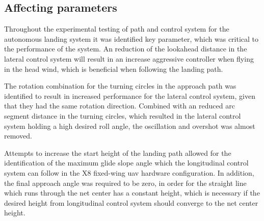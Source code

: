 \subsection{Affecting parameters}
Throughout the experimental testing of path and control system for the autonomous landing system it was identified key parameter, which was critical to the performance of the system. An reduction of the lookahead distance in the lateral control system will result in an increase aggressive controller when flying in the head wind, which is beneficial when following the landing path.

The rotation combination for the turning circles in the approach path was identified to result in increased performance for the lateral control system, given that they had the same rotation direction. Combined with an reduced arc segment distance in the turning circles, which resulted in the lateral control system holding a high desired roll angle, the oscillation and overshot was almost removed.

Attempts to increase the start height of the landing path allowed for the identification of the maximum glide slope angle which the longitudinal control system can follow in the X8 fixed-wing \gls{uav} hardware configuration. In addition, the final approach angle was required to be zero, in order for the straight line which runs through the net center has a constant height, which is necessary if the desired height from longitudinal control system should converge to the net center height.


